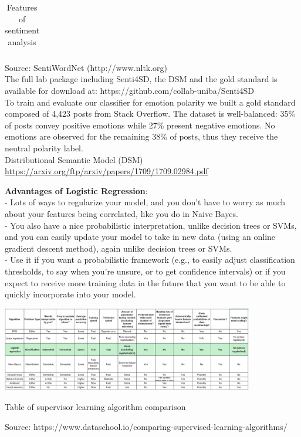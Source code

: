 \documentclass{beamer}
\begin{document}
\begin{frame}
{\begin{table}[]
\begin{tabular}{|l|l|lll}
			
		\end{tabular}
		\caption{Features of sentiment analysis}
		\label{tab:3}
\end{table}}

{\tiny Source: SentiWordNet (http://www.nltk.org)} \\
{\tiny The full lab package including Senti4SD, the DSM and the gold standard is available for download at: https://github.com/collab-uniba/Senti4SD} \\
{\tiny To train and evaluate our classifier for emotion polarity we built a gold standard composed of 4,423 posts from Stack
Overflow. The dataset is well-balanced: 35\% of posts convey positive emotions while 27\% present negative emotions. No emotions are observed for the remaining 38\% of posts, thus they receive the neutral polarity label. \\}
{\tiny Distributional Semantic Model (DSM) \url{https://arxiv.org/ftp/arxiv/papers/1709/1709.02984.pdf}}
\end{frame}
\begin{frame}
\textbf{Advantages of Logistic Regression}: \\
- Lots of ways to regularize your model, and you don’t have to worry as much about your features being correlated, like you do in Naive Bayes. \\
- You also have a nice probabilistic interpretation, unlike decision trees or SVMs, and you can easily update your model to take in new data (using an online gradient descent method), again unlike decision trees or SVMs. \\
- Use it if you want a probabilistic framework (e.g., to easily adjust classification thresholds, to say when you’re unsure, or to get confidence intervals) or if you expect to receive more training data in the future that you want to be able to quickly incorporate into your model.
\end{frame}
\begin{frame}
\includegraphics[width=110mm]{compare.png} \\
\begin{center}
	Table of supervisor learning algorithm comparison
\end{center}


{\tiny Source: https://www.dataschool.io/comparing-supervised-learning-algorithms/}
\end{frame}
\end{document}
